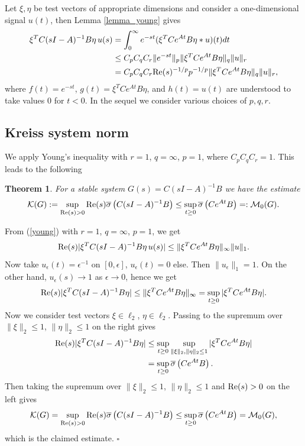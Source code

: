 \documentclass[12pt, a4paper,reqno]{amsart}
\newtheorem{theorem}{\bf Theorem}
\renewenvironment{proof}{\noindent {\bf Proof: }}{\rm\\}
\theoremstyle{definition}
\begin{document}
Let $\xi,\eta$ be test vectors of appropriate dimensions and consider a one-dimensional signal $u(t)$, then Lemma \ref{lemma_young} gives
\begin{align}
\label{young}
\begin{split}
\xi^TC(sI-A)^{-1} B \eta\, u(s) &= \int_0^\infty e^{-st} (\xi^T Ce^{At}B \eta \ast u)(t) dt \\
&\leq C_{p}C_qC_{r} \|e^{-st}\|_p \|\xi^TCe^{At}B\eta\|_q \|u\|_r \\
&= C_{p}C_qC_{r} {\rm Re}(s)^{-1/p} p^{-1/p}   \|\xi^TCe^{At}B\eta\|_q \|u\|_r,
\end{split}
\end{align}
where $f(t)=e^{-st}$,  $g(t)=\xi^TCe^{At}B\eta$, and $h(t) = u(t)$ are understood to take values $0$ for $t < 0$. 
In the sequel we consider various choices of $p,q,r$. 


\subsection{Kreiss system norm}
\label{sect_kreiss}
We apply Young's inequality with 
$r=1$, $q=\infty$, $p=1$, where $C_pC_qC_r=1$.
This leads to the following

\begin{theorem}\label{KreissLB}
For a stable system $G(s) = C(sI-A)^{-1}B$ we have the estimate
\begin{equation}
\mathcal K(G) := \sup_{{\rm Re}(s) > 0} {\rm Re}(s) \overline{\sigma} \left( C(sI-A)^{-1} B\right)
\leq \sup_{t\geq 0} \overline{\sigma} \left(  Ce^{At}B \right) =: \mathcal M_0(G). 
\end{equation}
\end{theorem}

\begin{proof}
From (\ref{young}) with $r=1$, $q=\infty$, $p=1$, we get
$$
{\rm Re}(s) | \xi^TC (sI-A)^{-1} B\eta\, u(s)| \leq \|\xi^TC e^{At}B\eta \|_\infty \|u\|_1.
$$
Now take $u_\epsilon(t) = \epsilon^{-1}$ on $[0,\epsilon]$, $u_\epsilon(t) = 0$ else. Then $\|u_\epsilon\|_1=1$.
On the other hand, $u_\epsilon(s) \to 1$ as $\epsilon \to 0$, hence we get
$$
{\rm Re}(s) |\xi^TC (sI-A)^{-1} B\eta | \leq \|\xi^TCe^{At}B\eta\|_\infty =\sup_{t\geq 0} |\xi^T Ce^{At}B\eta |.
$$
Now we consider test vectors $\xi\in \ell_2$, $\eta\in \ell_2$.
Passing to the supremum over  $\|\xi\|_2\leq 1$, $\|\eta\|_2\leq 1$ on the right gives
\begin{align*}
{\rm Re}(s) |\xi^TC(sI-A)^{-1}B\eta| &\leq \sup_{t\geq 0} \sup_{\|\xi\|_2,\|\eta\|_2 \leq 1} | \xi^T Ce^{At} B\eta | \\
&= \sup_{t\geq 0} \overline{\sigma} \left( Ce^{At}B \right).
\end{align*}
Then taking the supremum over $\|\xi\|_2\leq 1$, $\|\eta\|_2\leq 1$ and ${\rm Re}(s) > 0$ on the left gives
$$
\mathcal K(G)= \sup_{{\rm Re}(s) > 0} {\rm Re}(s) \overline{\sigma} \left(  C(sI-A)^{-1}B\right) \leq\sup_{t\geq 0} \overline{\sigma} \left( Ce^{At}B \right)=\mathcal M_0(G),
$$
which is the claimed estimate.
\hfill $\square$
\end{proof}
\end{document}
